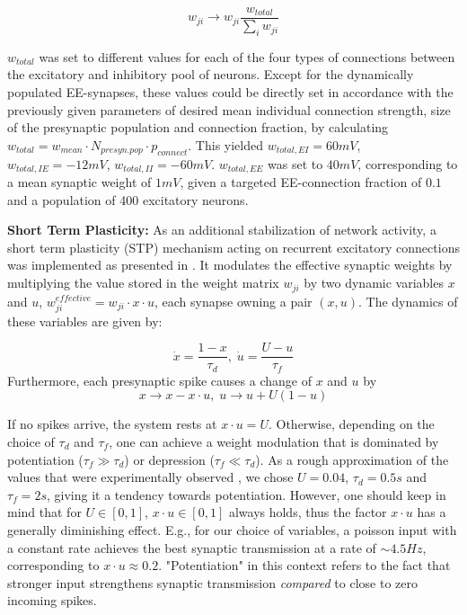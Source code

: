 \documentclass[10pt,a4paper]{article}
\begin{document}
\begin{equation}
w_{ji} \rightarrow w_{ji} \frac{w_{total}}{\sum_i w_{ji}}
\label{Synnnorm}
\end{equation}

$w_{total}$ was set to different values for each of the four types of connections between the excitatory and inhibitory pool of neurons. Except for the dynamically populated EE-synapses, these values could be directly set in accordance with the previously given parameters of desired mean individual connection strength, size of the presynaptic population and connection fraction, by calculating $w_{total} = w_{mean} \cdot N_{presyn. pop}\cdot p_{connect}$. This yielded $w_{total,EI} = 60 mV$, $w_{total,IE} = -12 mV$, $w_{total,II} = -60 mV$. $w_{total,EE}$ was set to $40mV$,  corresponding to a mean synaptic weight of $1mV$, given a targeted EE-connection fraction of $0.1$ and a population of 400 excitatory neurons.

\textbf{Short Term Plasticity:} As an additional stabilization of network activity, a short term plasticity (STP) mechanism acting on recurrent excitatory connections was implemented as presented in \cite{Markram_STP}. It modulates the effective synaptic weights by multiplying the value stored in the weight matrix $w_{ji}$ by two dynamic variables $x$ and $u$, $w^{effective}_{ji} = w_{ji}\cdot x \cdot u$, each synapse owning a pair $(x,u)$. The dynamics of these variables are given by:

\begin{equation}
\dot{x} = \frac{1-x}{\tau_d},\; \dot{u} = \frac{U-u}{\tau_f}
\label{STP_dynamics1}
\end{equation}
Furthermore, each presynaptic spike causes a change of $x$ and $u$ by
\begin{equation}
x \rightarrow x - x\cdot u,\; u \rightarrow u + U(1-u)
\label{STP_dynamics2}
\end{equation}

If no spikes arrive, the system rests at $x\cdot u = U$. Otherwise, depending on the choice of $\tau_d$ and $\tau_f$, one can achieve a weight modulation that is dominated by potentiation ($\tau_f \gg \tau_d$) or depression ($\tau_f \ll \tau_d$). As a rough approximation of the values that were experimentally observed \cite{Markram_STP}, we chose $U=0.04$, $\tau_d = 0.5s$ and $\tau_f = 2s$, giving it a tendency towards potentiation. However, one should keep in mind that for $U\in [0,1]$, $x\cdot u \in [0,1]$ always holds, thus the factor $x\cdot u$ has a generally diminishing effect. E.g., for our choice of variables, a poisson input with a constant rate achieves the best synaptic transmission at a rate of $\sim 4.5 Hz$, corresponding to $x\cdot u \approx 0.2$. "Potentiation" in this context refers to the fact that stronger input strengthens synaptic transmission \emph{compared} to close to zero incoming spikes.
\end{document}
